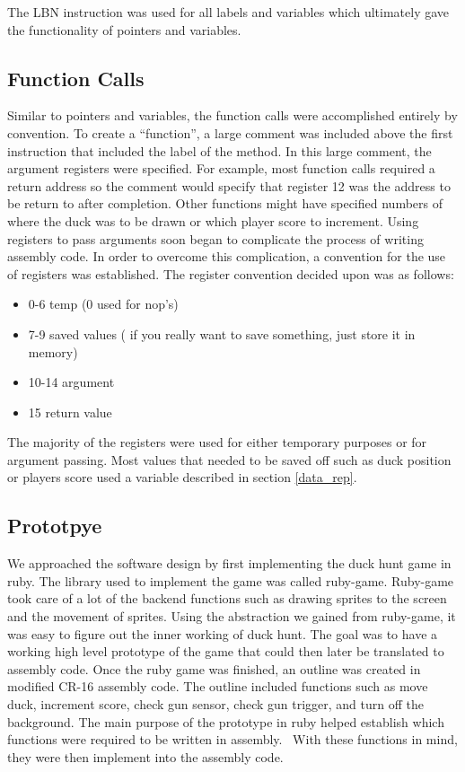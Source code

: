 \documentclass[letterpaper, 11 pt, conference]{article}
\begin{document}
The LBN instruction was used for all labels and variables which ultimately gave the functionality of pointers and variables. 

\subsection{Function Calls}

Similar to pointers and variables, the function calls were accomplished entirely by convention. To create a “function”, a large comment was included above the first instruction that included the label of the method. In this large comment, the argument registers were specified. For example, most function calls required a return address so the comment would specify that register 12 was the address to be return to after completion. Other functions might have specified numbers of where the duck was to be drawn or which player score to increment. Using registers to pass arguments soon began to complicate the process of writing assembly code. In order to overcome this complication, a convention for the use of registers was established. The register convention decided upon was as follows:

\begin{itemize}
    \item 0-6 temp (0 used for nop's)
    \item 7-9 saved values ( if you really want to save something, just store it in memory)
    \item 10-14 argument
    \item 15 return value
\end{itemize}


The majority of the registers were used for either temporary purposes or for argument passing. Most values that needed to be saved off such as duck position or players score used a variable described in section \ref{data_rep}.

\subsection{Prototpye}

We approached the software design by first implementing the duck hunt game in ruby. The library used to implement the game was called ruby-game. Ruby-game took care of a lot of the backend functions such as drawing sprites to the screen and the movement of sprites. Using the abstraction we gained from ruby-game, it was easy to figure out the inner working of duck hunt. The goal was to have a working high level prototype of the game that could then later be translated to assembly code. Once the ruby game was finished, an outline was created in modified CR-16 assembly code. The outline included functions such as move duck, increment score, check gun sensor, check gun trigger, and turn off the background. The main purpose of the prototype in ruby helped establish which functions were required to be written in assembly.  With these functions in mind, they were then implement into the assembly code.
\end{document}
